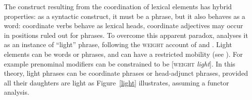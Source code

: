 {The construct resulting from the coordination of lexical elements has hybrid properties: as a syntactic construct, it must be a phrase, but it also behaves as a word: coordinate verbs behave as lexical heads, coordinate adjectives may occur in positions ruled out for phrases. To overcome this apparent paradox, \citet[Section~5.1]{Abeille:06} analyses it as an instance of ``light'' phrase, following the \textsc{weight} account of \citet{Abeille:Godard:2000} and \citet{Abeille:Godard:2004}. Light elements can be words or phrases, and can have a restricted mobility (see ). For example prenominal modifiers can be constrained to be [\textsc{weight} \emph{light}]. In this theory, light phrases can be coordinate phrases or head-adjunct phrases, provided all their daughters are light as Figure~\ref{light} illustrates, assuming a functor analysis.


}
